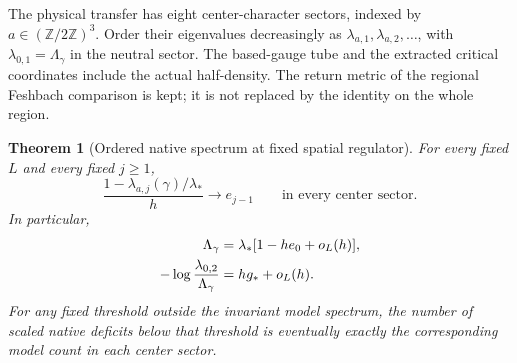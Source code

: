 \documentclass[11pt,oneside,openany]{book}
\newtheorem{theorem}{Theorem}[chapter]
\theoremstyle{definition}
\theoremstyle{remark}
\newcommand{\Z}{\mathbb Z}
\begin{document}
The physical transfer has eight center-character sectors, indexed by
$a\in(\Z/2\Z)^3$. Order their eigenvalues decreasingly as
$\lambda_{a,1},\lambda_{a,2},\ldots$, with
$\lambda_{0,1}=\Lambda_\gamma$ in the neutral sector. The based-gauge
tube and the extracted critical coordinates include the actual
half-density. The return metric of the regional Feshbach comparison
is kept; it is not replaced by the identity on the whole region.

\begin{theorem}[Ordered native spectrum at fixed spatial regulator]
\label{thm:native-critical-spectrum}
For every fixed $L$ and every fixed $j\ge1$,
\begin{equation}
 \frac{1-\lambda_{a,j}(\gamma)/\lambda_*}{h}
                \longrightarrow e_{j-1}
                   \qquad\text{in every center sector}.
 \label{eq:native-ordered-spectrum}
\end{equation}
In particular,
\begin{align}
 \Lambda_\gamma&=\lambda_*[1-he_0+o_L(h)],\notag\\
 -\log\frac{\lambda_{0,2}}{\Lambda_\gamma}
                      &=h g_*+o_L(h).
 \label{eq:native-neutral-gap}
\end{align}
For any fixed threshold outside the invariant model spectrum, the
number of scaled native deficits below that threshold is eventually
exactly the corresponding model count in each center sector.
\end{theorem}
\end{document}
